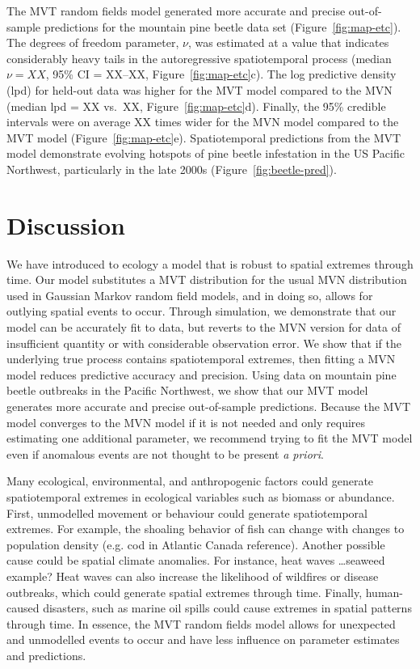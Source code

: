 \documentclass[12pt,english]{article}
\begin{document}
\begin{spacing}{1.3}
The MVT random fields model generated more accurate and precise out-of-sample
predictions for the mountain pine beetle data set (Figure~\ref{fig:map-etc}).
The degrees of freedom parameter, $\nu$, was estimated at a value that
indicates considerably heavy tails in the autoregressive spatiotemporal process
(median $\nu = XX$, 95\% CI = XX--XX, Figure~\ref{fig:map-etc}c). The log
predictive density (lpd) for held-out data was higher for the MVT model
compared to the MVN (median lpd = XX vs.\ XX, Figure~\ref{fig:map-etc}d).
Finally, the 95\% credible intervals were on average XX times wider for the MVN
model compared to the MVT model (Figure~\ref{fig:map-etc}e). Spatiotemporal
predictions from the MVT model demonstrate evolving hotspots of pine beetle
infestation in the US Pacific Northwest, particularly in the late 2000s
(Figure~\ref{fig:beetle-pred}).

\section{Discussion}

We have introduced to ecology a model that is robust to spatial extremes through
time. Our model substitutes a MVT distribution for the usual MVN distribution
used in Gaussian Markov random field models, and in doing so, allows for
outlying spatial events to occur. Through simulation, we demonstrate that our
model can be accurately fit to data, but reverts to the MVN version for data of
insufficient quantity or with considerable observation error. We show that if
the underlying true process contains spatiotemporal extremes, then fitting a MVN
model reduces predictive accuracy and precision. Using data on mountain pine
beetle outbreaks in the Pacific Northwest, we show that our MVT model generates
more accurate and precise out-of-sample predictions. Because the MVT model
converges to the MVN model if it is not needed and only requires estimating one
additional parameter, we recommend trying to fit the MVT model even if anomalous
events are not thought to be present \textit{a priori}.

Many ecological, environmental, and anthropogenic factors could generate
spatiotemporal extremes in ecological variables such as biomass or abundance.
First, unmodelled movement or behaviour could generate spatiotemporal extremes.
For example, the shoaling behavior of fish can change with changes to population
density (e.g. cod in Atlantic Canada reference). Another possible cause could be
spatial climate anomalies. For instance, heat waves \ldots seaweed example? Heat
waves can also increase the likelihood of wildfires or disease outbreaks, which
could generate spatial extremes through time. Finally, human-caused disasters,
such as marine oil spills could cause extremes in spatial patterns through time.
In essence, the MVT random fields model allows for unexpected and unmodelled
events to occur and have less influence on parameter estimates and predictions.


\end{spacing}
\end{document}
